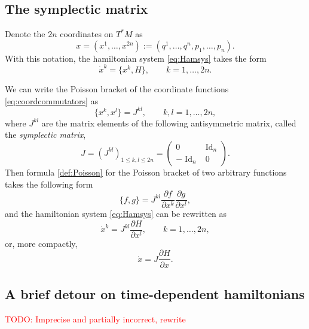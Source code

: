 \documentclass[english,fontsize=11pt,paper=b5]{scrbook}
\numberwithin{equation}{chapter}
\DeclareMathOperator{\Id}{Id}
\DeclareMathOperator{\Id}{Id}
\theoremstyle{definition}
\begin{document}
    \subsection{The symplectic matrix}\label{sec:symplmat}
    Denote the $2n$ coordinates on $T^*M$ as
    \begin{equation}
      x=(x^1, \ldots, x^{2n}) := (q^1, \ldots, q^n, p_1, \ldots, p_n).
    \end{equation}
    With this notation, the hamiltonian system \eqref{eq:Hamsys} takes the form
    \begin{equation}
      \dot x^k = \big\{x^k, H\big\}, \qquad k=1,\ldots,2n.
    \end{equation}

    We can write the Poisson bracket of the coordinate functions \eqref{eq:coordcommutators} as
    \begin{equation}
      \big\{x^k, x^l\big\} = J^{kl}, \qquad k,l = 1,\ldots,2n,
    \end{equation}
    where $J^{kl}$ are the matrix elements of the following antisymmetric matrix, called the \emph{symplectic matrix},
    \begin{equation}\label{eq:symmat}
      J = \left(J^{kl}\right)_{1\leq k,l\leq2n} = \begin{pmatrix}0 & \Id_n \\ -\Id_n & 0\end{pmatrix}.
    \end{equation}
    Then formula \eqref{def:Poisson} for the Poisson bracket of two arbitrary functions takes the following form
    \begin{equation}\label{eq:coordPB}
      \big\{f,g\big\} = J^{kl} \frac{\partial f}{\partial x^k}\frac{\partial g}{\partial x^l},
    \end{equation}
    and the hamiltonian system \eqref{eq:Hamsys} can be rewritten as
    \begin{equation}
      \dot x^k = J^{kl} \frac{\partial H}{\partial x^l}, \qquad k=1,\ldots,2n,
    \end{equation}
    or, more compactly,
    \begin{equation}\label{eq:hamsysJ}
      \dot x = J \frac{\partial H}{\partial x}.
    \end{equation}

    \subsection{A brief detour on time-dependent hamiltonians}\label{sec:timedepH}
    \textcolor{red}{TODO: Imprecise and partially incorrect, rewrite}
\end{document}
